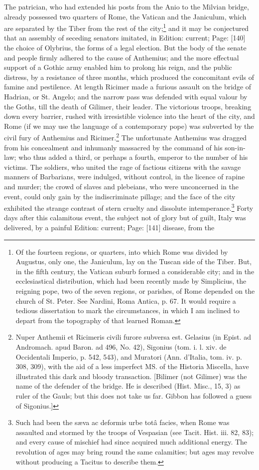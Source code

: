 The patrician, who had extended his posts from the Anio to the Milvian bridge, already possessed two quarters of Rome, the Vatican and the Janiculum, which are separated by the Tiber from the rest of the city;\footnote{Of the fourteen regions, or quarters, into which Rome was divided by Augustus, only one, the Janiculum, lay on the Tuscan side of the Tiber. But, in the fifth century, the Vatican suburb formed a considerable city; and in the ecclesiastical distribution, which had been recently made by Simplicius, the reigning pope, two of the seven regions, or parishes, of Rome depended on the church of St. Peter. See Nardini, Roma Antica, p. 67. It would require a tedious dissertation to mark the circumstances, in which I am inclined to depart from the topography of that learned Roman.} and it may be conjectured that an assembly of seceding senators imitated, in Edition: current; Page: [140] the choice of Olybrius, the forms of a legal election. But the body of the senate and people firmly adhered to the cause of Anthemius; and the more effectual support of a Gothic army enabled him to prolong his reign, and the public distress, by a resistance of three months, which produced the concomitant evils of famine and pestilence. At length Ricimer made a furious assault on the bridge of Hadrian, or St. Angelo; and the narrow pass was defended with equal valour by the Goths, till the death of Gilimer, their leader. The victorious troops, breaking down every barrier, rushed with irresistible violence into the heart of the city, and Rome (if we may use the language of a contemporary pope) was subverted by the civil fury of Anthemius and Ricimer.\footnote{Nuper Anthemii et Ricimeris civili furore subversa est. Gelasius (in Epist. ad Andromach. apud Baron. ad 496, No. 42), Sigonius (tom. i. l. xiv. de Occidentali Imperio, p. 542, 543), and Muratori (Ann. d\texthebrew{}’Italia, tom. iv. p. 308, 309), with the aid of a less imperfect MS. of the Historia Miscella, have illustrated this dark and bloody transaction. [Bilimer (not Gilimer) was the name of the defender of the bridge. He is described (Hist. Misc., 15, 3) as ruler of the Gauls; but this does not take us far. Gibbon has followed a guess of Sigonius.]} The unfortunate Anthemius was dragged from his concealment and inhumanly massacred by the command of his son-in-law; who thus added a third, or perhaps a fourth, emperor to the number of his victims. The soldiers, who united the rage of factious citizens with the savage manners of Barbarians, were indulged, without control, in the licence of rapine and murder; the crowd of slaves and plebeians, who were unconcerned in the event, could only gain by the indiscriminate pillage; and the face of the city exhibited the strange contrast of stern cruelty and dissolute intemperance.\footnote{Such had been the sæva ac deformis urbe totâ facies, when Rome was assaulted and stormed by the troops of Vespasian (see Tacit. Hist. iii. 82, 83); and every cause of mischief had since acquired much additional energy. The revolution of ages may bring round the same calamities; but ages may revolve without producing a Tacitus to describe them.} Forty days after this calamitous event, the subject not of glory but of guilt, Italy was delivered, by a painful Edition: current; Page: [141] disease, from the 